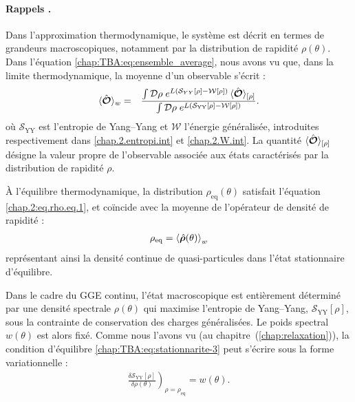 \begin{mdframed}[
	linewidth=0.5pt, 
	backgroundcolor=gray!5, 
	roundcorner=50pt,	
	innerleftmargin=5pt,
    innerrightmargin=5pt,
    innertopmargin=-10pt,
    innerbottommargin=2pt,
    leftmargin=2pt,
    rightmargin=2pt
	]
\paragraph{Rappels .}

Dans l’approximation thermodynamique, le système est décrit en termes de grandeurs macroscopiques, notamment par la distribution de rapidité $\rho(\theta)$.  
Dans l’équation \eqref{chap:TBA:eq:ensemble_average}, nous avons vu que, dans la limite thermodynamique, la moyenne d’un observable s’écrit :
\begin{eqnarray}
	\langle \hat{\bm{\mathcal{O}}} \rangle_{w} & = & \frac{\int \mathcal{D} \rho \; e^{L (\mathcal{S}_{YY}[\rho] - \mathcal{W}[\rho])} \, \langle\hat{\bm{\mathcal{O}}}\rangle_{[\rho]}}{\int \mathcal{D} \rho \; e^{L (\mathcal{S}_{\mathrm{YY}}[\rho] - \mathcal{W}[\rho])}}. \label{chap:Fluc:eq:ensemble_average}
\end{eqnarray}
où $\mathcal{S}_{\mathrm{YY}}$ est l’entropie de Yang–Yang et $\mathcal{W}$ l’énergie généralisée, introduites respectivement dans \eqref{chap.2.entropi.int} et \eqref{chap.2.W.int}.  
La quantité $\langle\hat{\bm{\mathcal{O}}}\rangle_{[\rho]}$ désigne la valeur propre de l’observable associée aux états caractérisés par la distribution de rapidité $\rho$.

\medskip

À l’équilibre thermodynamique, la distribution $\rho_{\mathrm{eq}}(\theta)$ satisfait l’équation \eqref{chap.2:eq.rho.eq.1}, et coïncide avec la moyenne de l’opérateur de densité de rapidité :
\begin{eqnarray}
	 \rho_{\mathrm{eq}} =  \braket{ \hat{\bm{\rho}}(\theta) }_w	
\end{eqnarray}
représentant ainsi la densité continue de quasi-particules dans l’état stationnaire d’équilibre.

\medskip

Dans le cadre du GGE continu, l’état macroscopique est entièrement déterminé par une densité spectrale $\rho(\theta)$ qui maximise l’entropie de Yang–Yang, $\mathcal{S}_{\mathrm{YY}}[\rho]$, sous la contrainte de conservation des charges généralisées. Le poids spectral $w(\theta)$ est alors fixé.  
Comme nous l’avons vu (au chapitre~(\ref{chap:relaxation})), la condition d’équilibre \eqref{chap:TBA:eq:stationnarite-3} peut s’écrire sous la forme variationnelle :
\begin{eqnarray}
	\left. \frac{\delta \mathcal{S}_{\mathrm{YY}}[\rho]}{\delta \rho(\theta)} \right)_{\rho = \rho_{\mathrm{eq}}} = w(\theta). \label{chap:Fluc:eq:stationnarite-3}
\end{eqnarray}

\end{mdframed}


